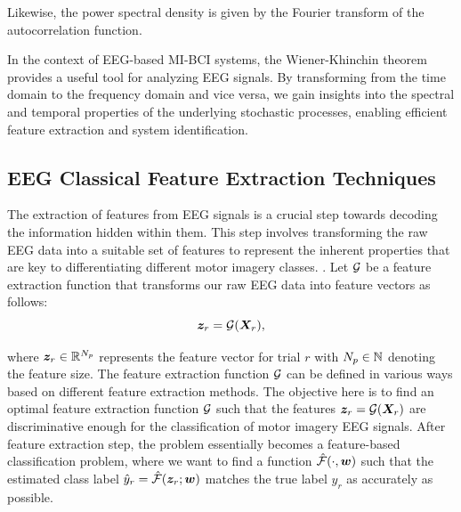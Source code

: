 
Likewise, the power spectral density is given by the Fourier transform of the autocorrelation function.


In the context of EEG-based MI-BCI systems, the Wiener-Khinchin theorem provides a useful tool for analyzing EEG signals. By transforming from the time domain to the frequency domain and vice versa, we gain insights into the spectral and temporal properties of the underlying stochastic processes, enabling efficient feature extraction and system identification.


\subsection{EEG Classical Feature Extraction Techniques}

The extraction of features from EEG signals is a crucial step towards decoding the information hidden within them. This step involves transforming the raw EEG data into a suitable set of features to represent the inherent properties that are key to differentiating different motor imagery classes. . Let $\mathcal {G}$ be a feature extraction function that transforms our raw EEG data into feature vectors as follows:
\begin{equation}
\bm {z}_r = \mathcal {G}(\bm {X}_r),
\end{equation}

where $\bm {z}_r \in \mathbb{R}^{N_p}$ represents the feature vector for trial $r$ with $N_p \in \mathbb{N}$ denoting the feature size. The feature extraction function $\mathcal {G}$ can be defined in various ways based on different feature extraction methods. The objective here is to find an optimal feature extraction function $\mathcal {G}$ such that the features $\bm {z}_r = \mathcal {G}(\bm {X}_r)$ are discriminative enough for the classification of motor imagery EEG signals. After feature extraction step, the problem essentially becomes a feature-based classification problem, where we want to find a function $\hat{\mathcal {F}}(\cdot,\bm {w})$ such that the estimated class label $\hat{y}_r = \hat{\mathcal {F}}(\bm {z}_r; \bm {w})$ matches the true label $y_r$ as accurately as possible.

